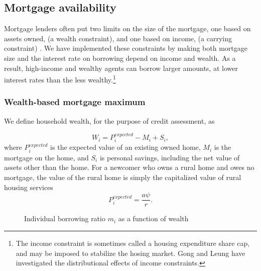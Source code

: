 {\color{black}

\subsection{Mortgage availability} \label{sec:mortgage-availability}
Mortgage lenders often put two limits on the size of the mortgage, one based on assets owned, (a {wealth constraint}), and one based on income, (a {carrying constraint}) \cite{CanadaHousingSupply2022}. We have implemented these constraints by making both mortgage size and the interest rate on borrowing depend on income and wealth. As a result, high-income and wealthy agents can borrow larger amounts, at lower interest rates than the less wealthy.\footnote{The income constraint is sometimes called a housing expenditure share cap, and may be imposed to stabilize the hosing market. Gong and Leung \cite{yifangongDoesSpaceMatter2003} have investigated the distributional effects of income constraints.} %


\subsubsection{Wealth-based mortgage maximum} 
We define household wealth, for the purpose of credit assessment, as

\begin{equation} 
W_i= P^{expected}_i - M_i  +S_i, 
\end{equation}
where $P^{expected}_i$ is the expected value of an existing owned home, $M_i$ is the mortgage on the home, and $S_i$ is personal savings, including the net value of assets other than the home. %
For a newcomer who owns a rural home and owes no mortgage, the value of the rural home is simply the capitalized value of rural housing services
\begin{equation} 
P^{expected}_i = \frac{a\psi}{r}.
\end{equation}


    \begin{figure}[htb]
    \begin{center}
    
    \end{center}
    \caption{Individual borrowing ratio $m_i$ as a function of wealth}
    \label{fig-borrowing-ratio}
    \end{figure}


}
